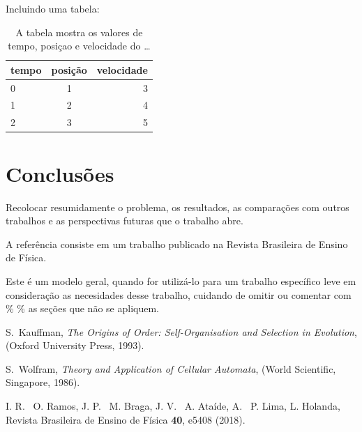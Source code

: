Incluindo uma tabela:
\begin{table}[h]
\begin{tabular}{||l|c|r||} \hline
tempo& posição & velocidade\\
\hline
0 & 1 & 3\\
 1 & 2 & 4\\
 2 & 3 & 5\\
 \hline
 \end{tabular}
 \caption{A tabela mostra os valores de tempo, posiçao e velocidade do
{\ldots} }
\end{table}

\section{Conclusões}
Recolocar resumidamente o problema, os resultados, as comparações \cite{Wolfram_book} com outros
trabalhos e as perspectivas futuras que o trabalho abre.

A referência \cite{Ramos+18} consiste em um trabalho publicado na Revista Brasileira de Ensino de Física.

{\color{red} Este é um modelo geral, quando for utilizá-lo para um trabalho
específico leve em consideração as necesidades desse trabalho,
cuidando de omitir ou comentar com \% \% as seções que não
se apliquem.}

\begin{thebibliography}{99}

S.~Kauffman, {\em The Origins of Order: Self-Organisation and
Selection in Evolution}, (Oxford University Press, 1993).

S.~Wolfram, {\em Theory and Application of Cellular Automata},
(World Scientific, Singapore, 1986).

I. R. ~O. Ramos, J. P. ~M. Braga, J. V. ~A. Ataíde, A. ~P. Lima, L. Holanda,
Revista Brasileira de Ensino de Física \textbf{40}, e5408 (2018).

\end{thebibliography}



